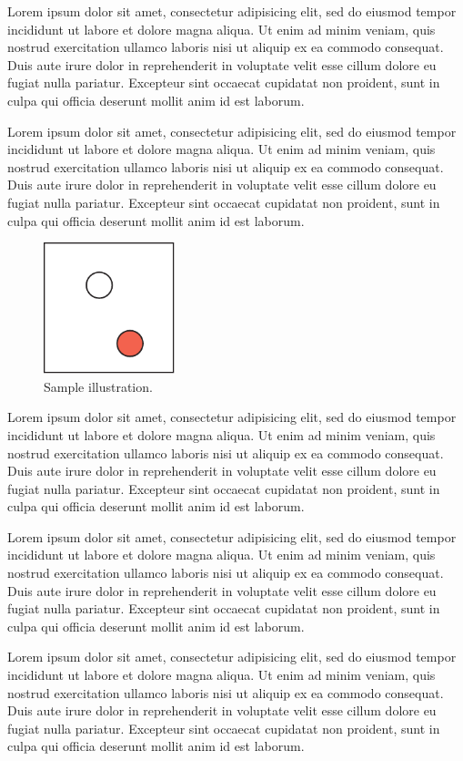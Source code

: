 \documentclass[conference]{acmsiggraph}
\begin{document}
Lorem ipsum dolor sit amet, consectetur adipisicing elit, sed do
eiusmod tempor incididunt ut labore et dolore magna aliqua. Ut enim ad
minim veniam, quis nostrud exercitation ullamco laboris nisi ut
aliquip ex ea commodo consequat. Duis aute irure dolor in
reprehenderit in voluptate velit esse cillum dolore eu fugiat nulla
pariatur. Excepteur sint occaecat cupidatat non proident, sunt in
culpa qui officia deserunt mollit anim id est laborum.


Lorem ipsum dolor sit amet, consectetur adipisicing elit, sed do
eiusmod tempor incididunt ut labore et dolore magna aliqua. Ut enim ad
minim veniam, quis nostrud exercitation ullamco laboris nisi ut
aliquip ex ea commodo consequat. Duis aute irure dolor in
reprehenderit in voluptate velit esse cillum dolore eu fugiat nulla
pariatur. Excepteur sint occaecat cupidatat non proident, sunt in
culpa qui officia deserunt mollit anim id est laborum.
\begin{figure}[ht]
  \centering
  \includegraphics[width=1.5in]{images/samplefigure}
  \caption{Sample illustration.}
\end{figure}
Lorem ipsum dolor sit amet, consectetur adipisicing elit, sed do
eiusmod tempor incididunt ut labore et dolore magna aliqua. Ut enim ad
minim veniam, quis nostrud exercitation ullamco laboris nisi ut
aliquip ex ea commodo consequat. Duis aute irure dolor in
reprehenderit in voluptate velit esse cillum dolore eu fugiat nulla
pariatur. Excepteur sint occaecat cupidatat non proident, sunt in
culpa qui officia deserunt mollit anim id est laborum.

Lorem ipsum dolor sit amet, consectetur adipisicing elit, sed do
eiusmod tempor incididunt ut labore et dolore magna aliqua. Ut enim ad
minim veniam, quis nostrud exercitation ullamco laboris nisi ut
aliquip ex ea commodo consequat. Duis aute irure dolor in
reprehenderit in voluptate velit esse cillum dolore eu fugiat nulla
pariatur. Excepteur sint occaecat cupidatat non proident, sunt in
culpa qui officia deserunt mollit anim id est laborum.

Lorem ipsum dolor sit amet, consectetur adipisicing elit, sed do
eiusmod tempor incididunt ut labore et dolore magna aliqua. Ut enim ad
minim veniam, quis nostrud exercitation ullamco laboris nisi ut
aliquip ex ea commodo consequat. Duis aute irure dolor in
reprehenderit in voluptate velit esse cillum dolore eu fugiat nulla
pariatur. Excepteur sint occaecat cupidatat non proident, sunt in
culpa qui officia deserunt mollit anim id est laborum.
\end{document}
